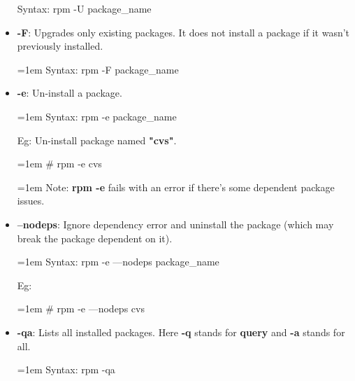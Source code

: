 \begin{flushleft}
\begin{itemize}
\begin{tcolorbox}[breakable,notitle,boxrule=-0pt,colback=pink,colframe=pink]
			Syntax: rpm -U package\_name
			\font=4pt
		\end{tcolorbox}
		\bigskip
		\bigskip
		\item \textbf{-F}: Upgrades only existing packages. It does not install a package if it wasn't previously installed.
		\begin{tcolorbox}[breakable,notitle,boxrule=-0pt,colback=pink,colframe=pink]
			\color{black}
			\font=1em
			Syntax: rpm -F package\_name
			\font=4pt
		\end{tcolorbox}
		\bigskip
		\bigskip
		\item \textbf{-e}: Un-install a package.
		\begin{tcolorbox}[breakable,notitle,boxrule=-0pt,colback=pink,colframe=pink]
			\color{black}
			\font=1em
			Syntax: rpm -e package\_name
			\font=4pt
		\end{tcolorbox}
		Eg: Un-install package named \textbf{"cvs"}.
		\bigskip
		\begin{tcolorbox}[breakable,notitle,boxrule=-0pt,colback=black,colframe=black]
			\color{white}
			\font=1em
			\color{green}
			\# rpm -e cvs
			\font=4pt
		\end{tcolorbox}
		\bigskip
		\begin{tcolorbox}[breakable,notitle,boxrule=-0pt,colback=yellow,colframe=yellow]
			\color{black}
			\font=1em
			Note: \textbf{rpm -e} fails with an error if there's some dependent package issues.
			\font=4pt
		\end{tcolorbox}
	
		\bigskip
		\bigskip
		\item \textbf{--nodeps}: Ignore dependency error and uninstall the package (which may break the package dependent on it).
		\bigskip
		\begin{tcolorbox}[breakable,notitle,boxrule=-0pt,colback=pink,colframe=pink]
			\color{black}
			\font=1em
			Syntax: rpm -e ---nodeps package\_name
			\font=4pt
		\end{tcolorbox}
		
		Eg: 
		\bigskip
		\begin{tcolorbox}[breakable,notitle,boxrule=-0pt,colback=black,colframe=black]
			\color{white}
			\font=1em
			\color{green}
			\# rpm -e ---nodeps cvs
			\font=4pt
		\end{tcolorbox}
		
		\bigskip
		\bigskip
		\item \textbf{-qa}: Lists all installed packages. Here \textbf{-q} stands for \textbf{query} and \textbf{-a} stands for all.
		\bigskip
		\begin{tcolorbox}[breakable,notitle,boxrule=-0pt,colback=pink,colframe=pink]
			\color{black}
			\font=1em
			Syntax: rpm -qa
			\font=4pt
		\end{tcolorbox}
		

\end{itemize}
\end{flushleft}
